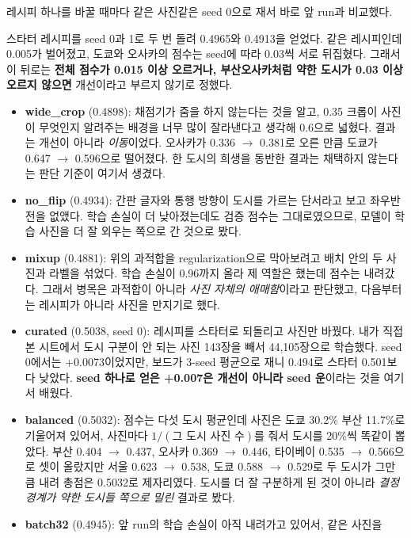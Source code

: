 \documentclass[11pt]{article}
\begin{document}
레시피 하나를 바꿀 때마다 같은 사진\textperiodcentered{}같은 seed 0으로 재서 바로 앞 run과 비교했다.

스타터 레시피를 seed 0과 1로 두 번 돌려 0.4965와 0.4913을 얻었다. 같은 레시피인데
0.005가 벌어졌고, 도쿄와 오사카의 점수는 seed에 따라 0.03씩 서로 뒤집혔다. 그래서
이 뒤로는 \textbf{전체 점수가 0.015 이상 오르거나, 부산\textperiodcentered{}오사카처럼 약한 도시가 0.03
이상 오르지 않으면} 개선이라고 부르지 않기로 정했다.

\begin{itemize}
\item \textbf{wide\_crop} (0.4898): 채점기가 줌을 하지 않는다는 것을 알고, 0.35
  크롭이 사진이 무엇인지 알려주는 배경을 너무 많이 잘라낸다고 생각해 0.6으로 넓혔다.
  결과는 개선이 아니라 \emph{이동}이었다. 오사카가 0.336 $\rightarrow$ 0.381로 오른 만큼 도쿄가
  0.647 $\rightarrow$ 0.596으로 떨어졌다. 한 도시의 희생을 동반한 결과는 채택하지 않는다는
  판단 기준이 여기서 생겼다.
\item \textbf{no\_flip} (0.4934): 간판 글자와 통행 방향이 도시를 가르는 단서라고 보고
  좌우반전을 없앴다. 학습 손실이 더 낮아졌는데도 검증 점수는 그대로였으므로, 모델이
  학습 사진을 더 잘 외우는 쪽으로 간 것으로 봤다.
\item \textbf{mixup} (0.4881): 위의 과적합을 regularization으로 막아보려고 배치 안의
  두 사진과 라벨을 섞었다. 학습 손실이 0.96까지 올라 제 역할은 했는데 점수는
  내려갔다. 그래서 병목은 과적합이 아니라 \emph{사진 자체의 애매함}이라고 판단했고,
  다음부터는 레시피가 아니라 사진을 만지기로 했다.
\item \textbf{curated} (0.5038, seed 0): 레시피를 스타터로 되돌리고 사진만 바꿨다.
  내가 직접 본 시트에서 도시 구분이 안 되는 사진 143장을 빼서 44,105장으로 학습했다.
  seed 0에서는 +0.0073이었지만, 보드가 3-seed 평균으로 재니 0.494로 스타터 0.501보다
  낮았다. \textbf{seed 하나로 얻은 +0.007은 개선이 아니라 seed 운}이라는 것을 여기서
  배웠다.
\item \textbf{balanced} (0.5032): 점수는 다섯 도시 평균인데 사진은 도쿄 30.2\% \textperiodcentered{} 부산
  11.7\%로 기울어져 있어서, 사진마다 $1/(\text{그 도시 사진 수})$를 줘서 도시를 20\%씩
  똑같이 뽑았다. 부산 0.404 $\rightarrow$ 0.437, 오사카 0.369 $\rightarrow$ 0.446, 타이베이 0.535 $\rightarrow$ 0.566으로
  셋이 올랐지만 서울 0.623 $\rightarrow$ 0.538, 도쿄 0.588 $\rightarrow$ 0.529로 두 도시가 그만큼 내려 총점은
  0.5032로 제자리였다. 도시를 더 잘 구분하게 된 것이 아니라 \emph{결정 경계가 약한
  도시들 쪽으로 밀린} 결과로 봤다.
\item \textbf{batch32} (0.4945): 앞 run의 학습 손실이 아직 내려가고 있어서, 같은 사진을

\end{itemize}
\end{document}
